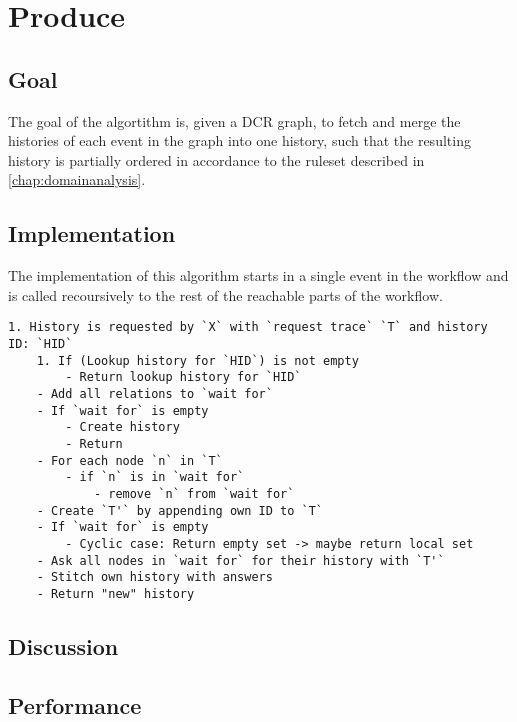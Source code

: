 \section{Produce}
\subsection{Goal} %
The goal of the algortithm is, given a DCR graph, to fetch and merge the histories of each event in the graph into one history, such that the resulting history is partially ordered in accordance to the ruleset described in \ref{chap:domainanalysis}. 


\subsection{Implementation} %
The implementation of this algorithm starts in a single event in the workflow and is called recoursively to the rest of the reachable parts of the workflow.

\begin{lstlisting}[breaklines=true]
 1. History is requested by `X` with `request trace` `T` and history ID: `HID`
    1. If (Lookup history for `HID`) is not empty
        - Return lookup history for `HID`
    - Add all relations to `wait for`
    - If `wait for` is empty
        - Create history
        - Return
    - For each node `n` in `T`
        - if `n` is in `wait for`
            - remove `n` from `wait for`
    - Create `T'` by appending own ID to `T`
    - If `wait for` is empty
        - Cyclic case: Return empty set -> maybe return local set
    - Ask all nodes in `wait for` for their history with `T'`
    - Stitch own history with answers
    - Return "new" history
\end{lstlisting}

\subsection{Discussion} %
\subsection{Performance} %
